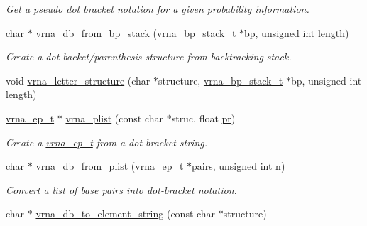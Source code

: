 \begin{DoxyCompactItemize}
\begin{DoxyCompactList}\small\item\em Get a pseudo dot bracket notation for a given probability information. \end{DoxyCompactList}\item 
char $\ast$ \mbox{\hyperlink{group__struct__utils_ga27bea2c241564af53a065982183389df}{vrna\+\_\+db\+\_\+from\+\_\+bp\+\_\+stack}} (\mbox{\hyperlink{group__data__structures_gaa651bda42e7692f08cb603cd6834b0ee}{vrna\+\_\+bp\+\_\+stack\+\_\+t}} $\ast$bp, unsigned int length)
\begin{DoxyCompactList}\small\item\em Create a dot-\/backet/parenthesis structure from backtracking stack. \end{DoxyCompactList}\item 
void \mbox{\hyperlink{group__struct__utils_ga6708519ddf10f1420016ad47b5a3baea}{vrna\+\_\+letter\+\_\+structure}} (char $\ast$structure, \mbox{\hyperlink{group__data__structures_gaa651bda42e7692f08cb603cd6834b0ee}{vrna\+\_\+bp\+\_\+stack\+\_\+t}} $\ast$bp, unsigned int length)
\item 
\mbox{\hyperlink{group__struct__utils_gab9ac98ab55ded9fb90043b024b915aca}{vrna\+\_\+ep\+\_\+t}} $\ast$ \mbox{\hyperlink{group__struct__utils_gaf002d69024d709744664a8b9ca3dd77d}{vrna\+\_\+plist}} (const char $\ast$struc, float \mbox{\hyperlink{fold__vars_8h_ac98ec419070aee6831b44e5c700f090f}{pr}})
\begin{DoxyCompactList}\small\item\em Create a \mbox{\hyperlink{group__struct__utils_gab9ac98ab55ded9fb90043b024b915aca}{vrna\+\_\+ep\+\_\+t}} from a dot-\/bracket string. \end{DoxyCompactList}\item 
char $\ast$ \mbox{\hyperlink{group__struct__utils_ga6a51a36b9245d0bac868c5cd172b9611}{vrna\+\_\+db\+\_\+from\+\_\+plist}} (\mbox{\hyperlink{group__struct__utils_gab9ac98ab55ded9fb90043b024b915aca}{vrna\+\_\+ep\+\_\+t}} $\ast$\mbox{\hyperlink{group__struct__utils_ga6341cbb704924824e0236c1dce791032}{pairs}}, unsigned int n)
\begin{DoxyCompactList}\small\item\em Convert a list of base pairs into dot-\/bracket notation. \end{DoxyCompactList}\item 
char $\ast$ \mbox{\hyperlink{group__struct__utils_ga45360c09fb6d04d96e42dcccbb66015b}{vrna\+\_\+db\+\_\+to\+\_\+element\+\_\+string}} (const char $\ast$structure)

\end{DoxyCompactItemize}
